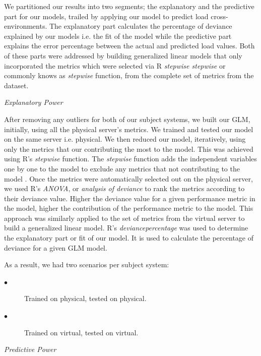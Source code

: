 We partitioned our results into two segments; the explanatory and the predictive part for our models, trailed by applying our model to predict load cross-environments. The explanatory part calculates the percentage of deviance explained by our models i.e. the fit of the model while the predictive part explains the error percentage between the actual and predicted load values. Both of these parts were addressed by building generalized linear models that only incorporated the metrics which were selected via R \textit{stepwise stepwise} or commonly knows as \textit{stepwise} function, from the complete set of metrics from the dataset.

\textit{Explanatory Power}

After removing any outliers for both of our subject systems, we built our GLM, initially, using all the physical server's metrics. We trained and tested our model on the same server i.e. physical. We then reduced our model, iteratively, using only the metrics that our contributing the most to the model. This was achieved using R's \textit{stepwise} function. The \textit{stepwise} function adds the independent variables one by one to the model to exclude any metrics that not contributing to the model \cite{RInAction}. Once the metrics were automatically selected out on the physical server, we used R's \textit{ANOVA}, or \textit{analysis of deviance} to rank the metrics according to their deviance value. Higher the deviance value for a given performance metric in the model, higher the contribution of the performance metric to the model. This approach was similarly applied to the set of metrics from the virtual server to build a generalized linear model. R's \textit{deviancepercentage} was used to determine the explanatory part or fit of our model. It is used to calculate the percentage of deviance for a given GLM model.

As a result, we had two scenarios per subject system:
\begin{description}
	\item[$\bullet$] Trained on physical, tested on physical.
	\item[$\bullet$] Trained on virtual, tested on virtual.
\end{description} 

\textit{Predictive Power}
	
	
